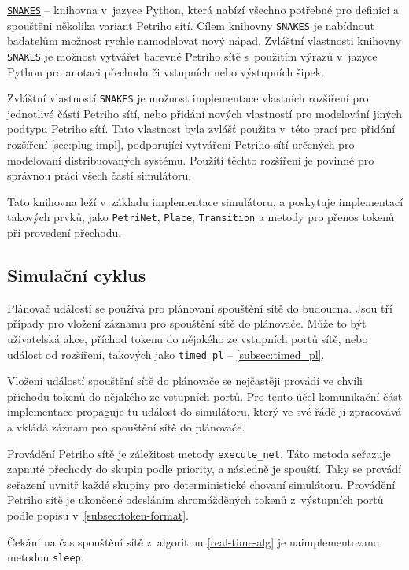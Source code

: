 \href{https://www.ibisc.univ-evry.fr/~fpommereau/SNAKES/}{\texttt{SNAKES}} -- knihovna v~jazyce Python, která nabízí všechno potřebné pro definici a spouštěni několika variant Petriho sítí. Cílem knihovny \texttt{SNAKES} je nabídnout badatelům možnost rychle namodelovat nový nápad. Zvláštní vlastnosti knihovny \texttt{SNAKES} je možnost vytvářet barevné Petriho sítě s~použitím výrazů v~jazyce Python pro anotaci přechodu či vstupních nebo výstupních šipek. \cite{snakes}

Zvláštní vlastností \texttt{SNAKES} je možnost implementace vlastních rozšíření pro jednotlivé částí Petriho sítí, nebo přidání nových vlastností pro modelování jiných podtypu Petriho sítí. Tato vlastnost byla zvlášť použita v~této prací pro přidání rozšíření \ref{sec:plug-impl}, podporující vytváření Petriho sítí určených pro modelovaní distribuovaných systému. Použítí těchto rozšíření je povinné pro správnou práci všech častí simulátoru.

Tato knihovna leží v~základu implementace simulátoru, a poskytuje implementací takových prvků, jako \texttt{PetriNet}, \texttt{Place}, \texttt{Transition} a metody pro přenos tokenů pří provedení přechodu.

\subsection{Simulační cyklus}


Plánovač událostí se používá pro plánovaní spouštění sítě do budoucna. Jsou tří případy pro vložení záznamu pro spouštění sítě do plánovače. Může to být uživatelská akce, příchod tokenu do nějakého ze vstupních portů sítě, nebo událost od rozšíření, takových jako \texttt{timed\_pl} -- \ref{subsec:timed_pl}.

Vložení událostí spouštění sítě do plánovače se nejčastěji provádí ve chvíli příchodu tokenů do nějakého ze vstupních portů. Pro tento účel komunikační část implementace propaguje tu událost do simulátoru, který ve své řádě ji zpracovává a vkládá záznam pro spouštění sítě do plánovače.

Provádění Petriho sítě je záležitost metody \texttt{execute\_net}. Táto metoda seřazuje zapnuté přechody do skupin podle priority, a následně je spouští. Taky se provádí seřazení uvnitř každé skupiny pro deterministické chovaní simulátoru. Provádění Petriho sítě je ukončené odesláním shromážděných tokenů z~výstupních portů podle popisu v~\ref{subsec:token-format}.

Čekání na čas spouštění sítě z~algoritmu \ref{real-time-alg} je naimplementovano metodou \texttt{sleep}.

